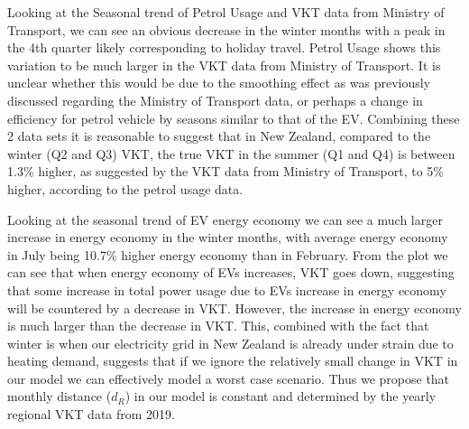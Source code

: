\documentclass[
]{article}
\begin{document}
Looking at the Seasonal trend of Petrol Usage and VKT data from Ministry
of Transport, we can see an obvious decrease in the winter months with a
peak in the 4th quarter likely corresponding to holiday travel. Petrol
Usage shows this variation to be much larger in the VKT data from
Ministry of Transport. It is unclear whether this would be due to the
smoothing effect as was previously discussed regarding the Ministry of
Transport data, or perhaps a change in efficiency for petrol vehicle by
seasons similar to that of the EV. Combining these 2 data sets it is
reasonable to suggest that in New Zealand, compared to the winter (Q2
and Q3) VKT, the true VKT in the summer (Q1 and Q4) is between 1.3\%
higher, as suggested by the VKT data from Ministry of Transport, to 5\%
higher, according to the petrol usage data.

Looking at the seasonal trend of EV energy economy we can see a much
larger increase in energy economy in the winter months, with average
energy economy in July being 10.7\% higher energy economy than in
February. From the plot we can see that when energy economy of EVs
increases, VKT goes down, suggesting that some increase in total power
usage due to EVs increase in energy economy will be countered by a
decrease in VKT. However, the increase in energy economy is much larger
than the decrease in VKT. This, combined with the fact that winter is
when our electricity grid in New Zealand is already under strain due to
heating demand, suggests that if we ignore the relatively small change
in VKT in our model we can effectively model a worst case scenario. Thus
we propose that monthly distance (\(d_{R}\)) in our model is constant
and determined by the yearly regional VKT data from 2019.
\end{document}
